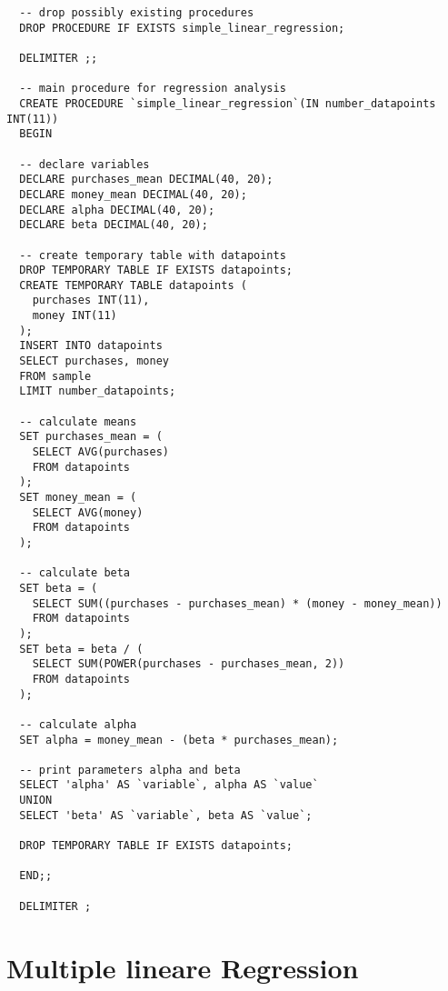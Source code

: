 \begin{verbatim}
  -- drop possibly existing procedures
  DROP PROCEDURE IF EXISTS simple_linear_regression;

  DELIMITER ;;

  -- main procedure for regression analysis
  CREATE PROCEDURE `simple_linear_regression`(IN number_datapoints INT(11))
  BEGIN

  -- declare variables
  DECLARE purchases_mean DECIMAL(40, 20);
  DECLARE money_mean DECIMAL(40, 20);
  DECLARE alpha DECIMAL(40, 20);
  DECLARE beta DECIMAL(40, 20);

  -- create temporary table with datapoints
  DROP TEMPORARY TABLE IF EXISTS datapoints;
  CREATE TEMPORARY TABLE datapoints (
    purchases INT(11),
    money INT(11)
  );
  INSERT INTO datapoints
  SELECT purchases, money
  FROM sample
  LIMIT number_datapoints;

  -- calculate means
  SET purchases_mean = (
    SELECT AVG(purchases)
    FROM datapoints
  );
  SET money_mean = (
    SELECT AVG(money)
    FROM datapoints
  );

  -- calculate beta
  SET beta = (
    SELECT SUM((purchases - purchases_mean) * (money - money_mean))
    FROM datapoints
  );
  SET beta = beta / (
    SELECT SUM(POWER(purchases - purchases_mean, 2))
    FROM datapoints
  );

  -- calculate alpha
  SET alpha = money_mean - (beta * purchases_mean);

  -- print parameters alpha and beta
  SELECT 'alpha' AS `variable`, alpha AS `value`
  UNION
  SELECT 'beta' AS `variable`, beta AS `value`;

  DROP TEMPORARY TABLE IF EXISTS datapoints;

  END;;

  DELIMITER ;
\end{verbatim}

\section{Multiple lineare Regression}
\label{appendix:D:2}

